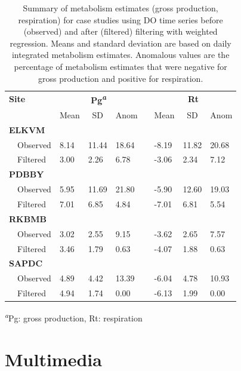 \documentclass[letterpaper,12pt,oneside]{article}\usepackage[]{graphicx}\usepackage[]{color}
\begin{document}
\begin{table}[!tbp]
\caption{Summary of metabolism estimates (gross production, respiration) for case studies using \ac{DO} time series before (observed) and after (filtered) filtering with weighted regression.  Means and standard deviation are based on daily integrated metabolism estimates.  Anomalous values are the percentage of metabolism estimates that were negative for gross production and positive for respiration.\label{tab:case_res}} 
\begin{center}
\begin{tabular}{llllclll}
\hline\hline
\multicolumn{1}{l}{\bfseries Site}&\multicolumn{3}{c}{\bfseries Pg\textsuperscript{\textit{a}}}&\multicolumn{1}{c}{\bfseries }&\multicolumn{3}{c}{\bfseries Rt}\tabularnewline
\cline{2-4} \cline{6-8}
\multicolumn{1}{l}{}&\multicolumn{1}{c}{Mean}&\multicolumn{1}{c}{SD}&\multicolumn{1}{c}{Anom}&\multicolumn{1}{c}{}&\multicolumn{1}{c}{Mean}&\multicolumn{1}{c}{SD}&\multicolumn{1}{c}{Anom}\tabularnewline
\hline
{\bfseries ELKVM}&&&&&&&\tabularnewline
~~Observed&8.14&11.44&18.64&&-8.19&11.82&20.68\tabularnewline
~~Filtered&3.00& 2.26& 6.78&&-3.06& 2.34& 7.12\tabularnewline
\hline
{\bfseries PDBBY}&&&&&&&\tabularnewline
~~Observed&5.95&11.69&21.80&&-5.90&12.60&19.03\tabularnewline
~~Filtered&7.01& 6.85& 4.84&&-7.01& 6.81& 5.54\tabularnewline
\hline
{\bfseries RKBMB}&&&&&&&\tabularnewline
~~Observed&3.02& 2.55& 9.15&&-3.62& 2.65& 7.57\tabularnewline
~~Filtered&3.46& 1.79& 0.63&&-4.07& 1.88& 0.63\tabularnewline
\hline
{\bfseries SAPDC}&&&&&&&\tabularnewline
~~Observed&4.89& 4.42&13.39&&-6.04& 4.78&10.93\tabularnewline
~~Filtered&4.94& 1.74& 0.00&&-6.13& 1.99& 0.00\tabularnewline
\hline
\end{tabular}\end{center}

\textsuperscript{\textit{a}}Pg: gross production, Rt: respiration\end{table}


\clearpage


\raggedbottom
\raggedright
\setlength{\parindent}{0.5in}

\section{Multimedia} \label{multi}

\end{document}
